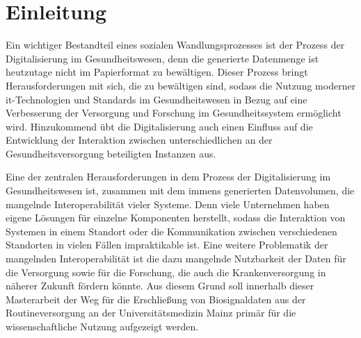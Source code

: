 \chapter{Einleitung} \label{ch:introduction}

Ein wichtiger Bestandteil eines sozialen Wandlungsprozesses ist der Prozess der Digitalisierung im Gesundheitswesen, denn die generierte Datenmenge ist heutzutage nicht im Papierformat zu bewältigen. Dieser Prozess bringt Herausforderungen mit sich, die zu bewältigen sind, sodass die Nutzung moderner \ac{it}-Technologien und Standards im Gesundheitswesen in Bezug auf eine Verbesserung der Versorgung und Forschung im Gesundheitssystem ermöglicht wird. Hinzukommend übt die Digitalisierung auch einen Einfluss auf die Entwicklung der Interaktion zwischen unterschiedlichen an der Gesundheitsversorgung beteiligten Instanzen aus. 

Eine der zentralen Herausforderungen in dem Prozess der Digitalisierung im Gesundheitswesen ist, zusammen mit dem immens generierten Datenvolumen, die mangelnde Interoperabilität vieler Systeme. Denn viele Unternehmen haben eigene Lösungen für einzelne Komponenten herstellt, sodass die Interaktion von Systemen in einem Standort oder die Kommunikation zwischen verschiedenen Standorten in vielen Fällen impraktikable ist. Eine weitere Problematik der mangelnden Interoperabilität ist die dazu mangelnde Nutzbarkeit der Daten für die Versorgung sowie für die Forschung, die auch die Krankenversorgung in näherer Zukunft fördern könnte. Aus diesem Grund soll innerhalb dieser Masterarbeit der Weg für die Erschließung von Biosignaldaten aus der Routineversorgung an der Universitätsmedizin Mainz primär für die wissenschaftliche Nutzung aufgezeigt werden.
